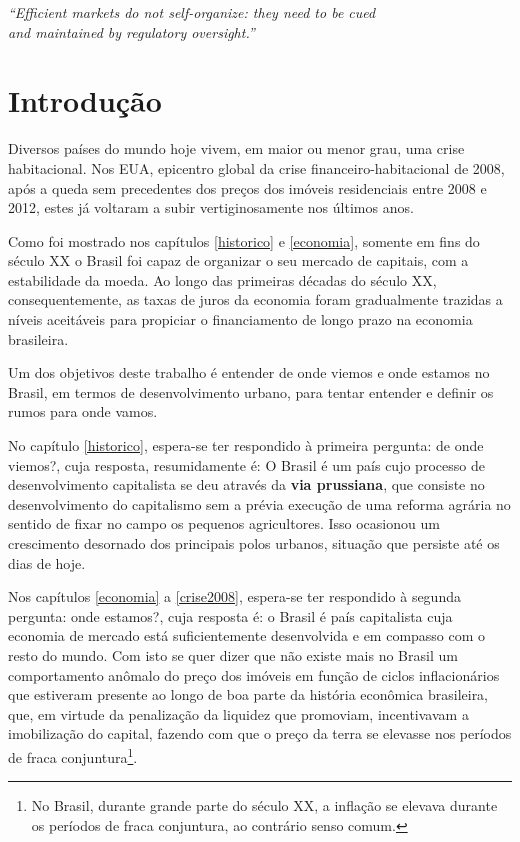 \documentclass[
	12pt,				%
	oneside,			%
	a4paper,			%
	chapter=TITLE,		%
	section=TITLE,		%
	english,			%
	brazil				%
	]{abntex2}
\begin{document}
\begin{refsection}
\begin{epigrafe}
    \vspace*{\fill}
    \begin{flushright}
    \textit{``Efficient markets do not self-organize: they need to be cued\\
    and maintained by regulatory oversight.''\\
    \cite[p. 540]{mccoy}}
    \end{flushright}
\end{epigrafe}
\hypertarget{introduuxe7uxe3o-5}{%
\section{Introdução}\label{introduuxe7uxe3o-5}}

Diversos países do mundo hoje vivem, em maior ou menor grau, uma
crise habitacional. Nos \gls{EUA}, epicentro global da
crise financeiro-habitacional de 2008, após a queda sem precedentes dos preços
dos imóveis residenciais entre 2008 e 2012, estes já voltaram a subir
vertiginosamente nos últimos anos.

Como foi mostrado nos capítulos \ref{historico} e \ref{economia}, somente em
fins do século XX o Brasil foi capaz de organizar o seu mercado de capitais, com
a estabilidade da moeda. Ao longo das primeiras décadas do século XX,
consequentemente, as taxas de juros da economia foram gradualmente trazidas a
níveis aceitáveis para propiciar o financiamento de longo prazo na economia
brasileira.

Um dos objetivos deste trabalho é entender de onde viemos e onde estamos no
Brasil, em termos de desenvolvimento urbano, para tentar entender e definir os
rumos para onde vamos.

No capítulo \ref{historico}, espera-se ter respondido à primeira pergunta: de
onde viemos?, cuja resposta, resumidamente é: O Brasil é um país cujo processo
de desenvolvimento capitalista se deu através da \textbf{via prussiana}, que
consiste no desenvolvimento do capitalismo sem a prévia execução de uma reforma
agrária no sentido de fixar no campo os pequenos agricultores. Isso ocasionou
um crescimento desornado dos principais polos urbanos, situação que persiste até
os dias de hoje.

Nos capítulos \ref{economia} a \ref{crise2008}, espera-se ter respondido à
segunda pergunta: onde estamos?, cuja resposta é: o Brasil é país capitalista
cuja economia de mercado está suficientemente desenvolvida e em compasso com o
resto do mundo. Com isto se quer dizer que não existe mais no Brasil um
comportamento anômalo do preço dos imóveis em função de ciclos inflacionários
que estiveram presente ao longo de boa parte da história econômica brasileira,
que, em virtude da penalização da liquidez que promoviam, incentivavam a
imobilização do capital, fazendo com que o preço da terra se elevasse nos
períodos de fraca conjuntura\footnote{No Brasil, durante grande parte do século XX, a inflação se elevava
  durante os períodos de fraca conjuntura, ao contrário senso comum.}.


\end{refsection}
\end{document}
